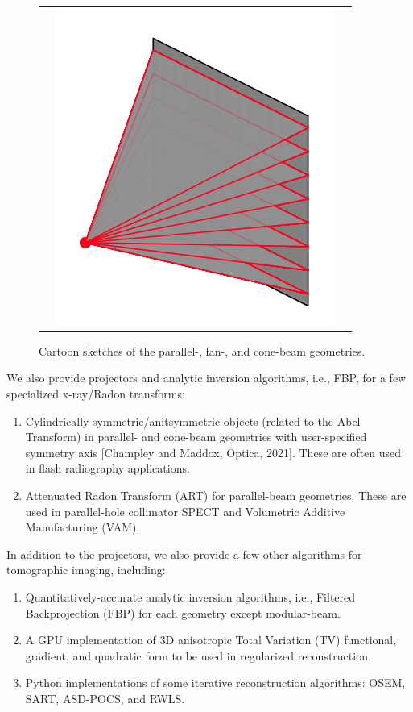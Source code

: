 \documentclass[11pt]{article}
\begin{document}
\begin{figure}[h]
\begin{tabular}{ccc}
& \includegraphics[scale=0.35]{coneBeam}
\end{tabular}
\caption{Cartoon sketches of the parallel-, fan-, and cone-beam geometries.} \label{fig:geometrySketches}
\end{figure}

We also provide projectors and analytic inversion algorithms, i.e., FBP, for a few specialized x-ray/Radon transforms:
\begin{enumerate}
\item Cylindrically-symmetric/anitsymmetric objects (related to the Abel Transform) in parallel- and cone-beam geometries with user-specified symmetry axis [Champley and Maddox, Optica, 2021]. These are often used in flash radiography applications.
\item Attenuated Radon Transform (ART) for parallel-beam geometries. These are used in parallel-hole collimator SPECT and Volumetric Additive Manufacturing (VAM).
\end{enumerate}

In addition to the projectors, we also provide a few other algorithms for tomographic imaging, including:
\begin{enumerate}
\item Quantitatively-accurate analytic inversion algorithms, i.e., Filtered Backprojection (FBP) for each geometry except modular-beam.
\item A GPU implementation of 3D anisotropic Total Variation (TV) functional, gradient, and quadratic form to be used in regularized reconstruction.
\item Python implementations of some iterative reconstruction algorithms: OSEM, SART, ASD-POCS, and RWLS.
\end{enumerate}
\end{document}
